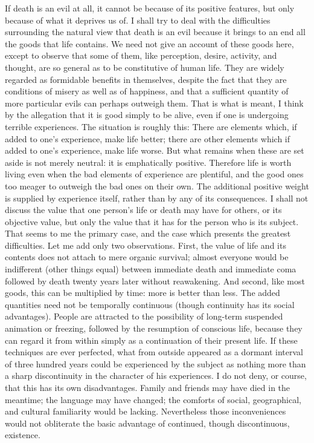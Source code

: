 If death is an evil at all, it cannot be because of its positive features, but only
because of what it deprives us of. I shall try to deal with the difficulties
surrounding the natural view that death is an evil because it brings to an end
all the goods that life contains. We need not give an account of these goods
here, except to observe that some of them, like perception, desire, activity, and
thought, are so general as to be constitutive of human life. They are widely
regarded as formidable benefits in themselves, despite the fact that they are
conditions of misery as well as of happiness, and that a sufficient quantity of
more particular evils can perhaps outweigh them. That is what is meant, I think
by the allegation that it is good simply to be alive, even if one is undergoing
terrible experiences. The situation is roughly this: There are elements which, if
added to one's experience, make life better; there are other elements which if
added to one's experience, make life worse. But what remains when these are
set aside is not merely neutral: it is emphatically positive. Therefore life is worth
living even when the bad elements of experience are plentiful, and the good
ones too meager to outweigh the bad ones on their own. The additional positive
weight is supplied by experience itself, rather than by any of its consequences.
I shall not discuss the value that one person's life or death may have for others,
or its objective value, but only the value that it has for the person who is its
subject. That seems to me the primary case, and the case which presents the 
greatest difficulties. Let me add only two observations. First, the value of life
and its contents does not attach to mere organic survival; almost everyone
would be indifferent (other things equal) between immediate death and
immediate coma followed by death twenty years later without reawakening.
And second, like most goods, this can be multiplied by time: more is better than
less. The added quantities need not be temporally continuous (though
continuity has its social advantages). People are attracted to the possibility of
long-term suspended animation or freezing, followed by the resumption of
conscious life, because they can regard it from within simply as a continuation
of their present life. If these techniques are ever perfected, what from outside
appeared as a dormant interval of three hundred years could be experienced
by the subject as nothing more than a sharp discontinuity in the character of
his experiences. I do not deny, or course, that this has its own disadvantages.
Family and friends may have died in the meantime; the language may have
changed; the comforts of social, geographical, and cultural familiarity would be
lacking. Nevertheless those inconveniences would not obliterate the basic
advantage of continued, though discontinuous, existence.

